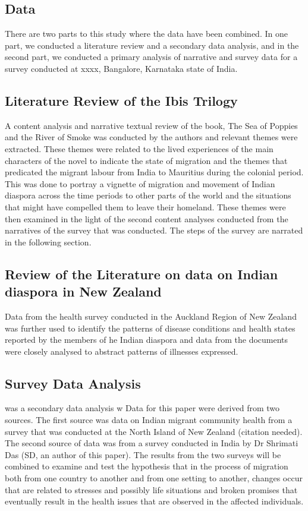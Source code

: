 \subsection*{Data}

There are two parts to this study where the data have been combined. In one part, we conducted a literature review and a secondary data analysis, and in the second part, we conducted a primary analysis of narrative and survey data for a survey conducted at xxxx, Bangalore, Karnataka state of India. 

\subsection*{Literature Review of the Ibis Trilogy}
A content analysis and narrative textual review of the book, The Sea of Poppies and the River of Smoke was conducted by the authors and relevant themes were extracted. These themes were related to the lived experiences of the main characters of the novel to indicate the state of migration and the themes that predicated the migrant labour from India to  Mauritius during the colonial period. This was done to portray a vignette of migration and movement of Indian diaspora across the time periods to other parts of the world and the situations that might have compelled them to leave their homeland. These themes were then examined in the light of the second content analyses conducted from the narratives of the survey that was conducted. The steps of the survey are narrated in the following section.

\subsection*{Review of the Literature on data on Indian diaspora in New Zealand}

Data from the health survey conducted in the Auckland Region of New Zealand was further used to identify the patterns of disease conditions and health states reported by the members of he Indian diaspora and data from the documents were closely analysed to abstract patterns of illnesses expressed. 

\subsection*{Survey Data Analysis}

 was a secondary data analysis w
Data for this paper were derived from two sources. The first source was data on Indian migrant community health from a survey that was conducted at the North Island of New Zealand (citation needed). The second source of data was from a survey conducted in India by Dr Shrimati Das (SD, an author of this paper). The results from the two surveys will be combined to examine and test the hypothesis that in the process of migration both from one country to another and from one setting to another, changes occur that are related to stresses and possibly life situations and broken promises that eventually result in the health issues that are observed in the affected individuals.

